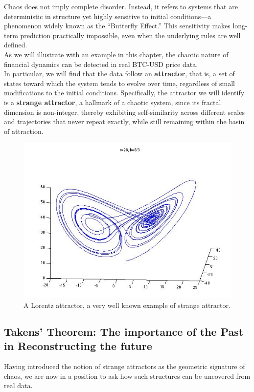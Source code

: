 Chaos does not imply complete disorder. Instead, it refers to systems that are deterministic in structure yet highly sensitive to initial conditions—a phenomenon widely known as the “Butterfly Effect.” This sensitivity makes long-term prediction practically impossible, even when the underlying rules are well defined.\\

As we will illustrate with an example in this chapter, the chaotic nature of financial dynamics can be detected in real BTC-USD price data.\\
In particular, we will find that the data follow an \textbf{attractor}, that is, a set of states toward which the system tends to evolve over time, regardless of small modifications to the initial conditions. Specifically, the attractor we will identify is a \textbf{strange attractor}, a hallmark of a chaotic system, since its fractal dimension is non-integer, thereby exhibiting self-similarity across different scales and trajectories that never repeat exactly, while still remaining within the basin of attraction.
\begin{figure} [H]
    \centering
    \includegraphics[width=0.75\linewidth]{img/image.png}
    \caption{A Lorentz attractor, a very well known example of strange attractor.}
\end{figure}

\subsection{Takens' Theorem: The importance of the Past in Reconstructing the future}
Having introduced the notion of strange attractors as the geometric signature of chaos, we are now in a position to ask how such structures can be uncovered from real data.\\

